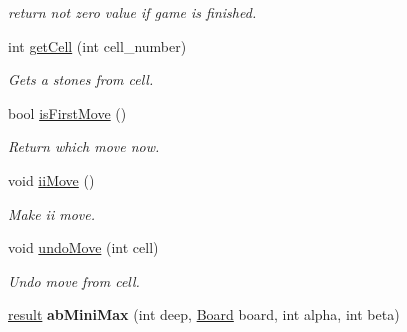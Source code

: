 \begin{DoxyCompactItemize}
\begin{DoxyCompactList}\small\item\em return not zero value if game is finished. \end{DoxyCompactList}\item 
int \hyperlink{class_board_a840e84e79ea9fd92820a0f71e7f2d444}{get\+Cell} (int cell\+\_\+number)
\begin{DoxyCompactList}\small\item\em Gets a stones from cell. \end{DoxyCompactList}\item 
bool \hyperlink{class_board_ad23ca69956781b6dcf632b15fea5b677}{is\+First\+Move} ()
\begin{DoxyCompactList}\small\item\em Return which move now. \end{DoxyCompactList}\item 
void \hyperlink{class_board_a9942340f81a2f60ac357a5fc9dad8313}{ii\+Move} ()
\begin{DoxyCompactList}\small\item\em Make ii move. \end{DoxyCompactList}\item 
void \hyperlink{class_board_ace9e1e576c696b98a959f16f9caf643e}{undo\+Move} (int cell)
\begin{DoxyCompactList}\small\item\em Undo move from cell. \end{DoxyCompactList}\item 
\hyperlink{structresult}{result} {\bfseries ab\+Mini\+Max} (int deep, \hyperlink{class_board}{Board} board, int alpha, int beta)\hypertarget{class_board_a126675d885b74d12c17a22f943476a68}{}\label{class_board_a126675d885b74d12c17a22f943476a68}


\end{DoxyCompactItemize}
